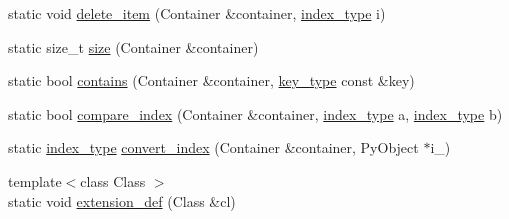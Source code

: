 \begin{DoxyCompactItemize}
\item 
static void \hyperlink{classboost_1_1python_1_1std__map__indexing__suite_a9af154020b49d26a30de90bfb07b122d}{delete\-\_\-item} (Container \&container, \hyperlink{classboost_1_1python_1_1std__map__indexing__suite_a4b2ac75883fba93dbca6d9e83197c842}{index\-\_\-type} i)
\item 
static size\-\_\-t \hyperlink{classboost_1_1python_1_1std__map__indexing__suite_a2a7b98e15824d0e74ae4620cbfa636d0}{size} (Container \&container)
\item 
static bool \hyperlink{classboost_1_1python_1_1std__map__indexing__suite_a89557475c8931027399dddf66fb251c1}{contains} (Container \&container, \hyperlink{classboost_1_1python_1_1std__map__indexing__suite_a4e2daeb60a58d6ce9964e0ea27680009}{key\-\_\-type} const \&key)
\item 
static bool \hyperlink{classboost_1_1python_1_1std__map__indexing__suite_a62974da613b1b56663d9736a8612bddd}{compare\-\_\-index} (Container \&container, \hyperlink{classboost_1_1python_1_1std__map__indexing__suite_a4b2ac75883fba93dbca6d9e83197c842}{index\-\_\-type} a, \hyperlink{classboost_1_1python_1_1std__map__indexing__suite_a4b2ac75883fba93dbca6d9e83197c842}{index\-\_\-type} b)
\item 
static \hyperlink{classboost_1_1python_1_1std__map__indexing__suite_a4b2ac75883fba93dbca6d9e83197c842}{index\-\_\-type} \hyperlink{classboost_1_1python_1_1std__map__indexing__suite_a79bc222baa6b652f2f688f2a3add9d75}{convert\-\_\-index} (Container \&container, Py\-Object $\ast$i\-\_\-)
\item 
{\footnotesize template$<$class Class $>$ }\\static void \hyperlink{classboost_1_1python_1_1std__map__indexing__suite_a32aecfee63f8763608a0149050134623}{extension\-\_\-def} (Class \&cl)
\end{DoxyCompactItemize}


